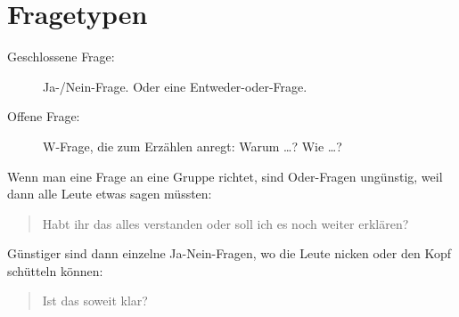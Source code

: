 \section{Fragetypen}
\label{fragetypen}

\begin{description}
\item[Geschlossene Frage:] Ja-/Nein-Frage. Oder eine Entweder-oder-Frage.
\item[Offene Frage:] W-Frage, die zum Erzählen anregt: Warum \ldots? Wie \ldots?
\end{description}

Wenn man eine Frage an eine Gruppe richtet, sind Oder-Fragen ungünstig, weil dann alle Leute etwas sagen müssten:

\begin{quotation}
Habt ihr das alles verstanden oder soll ich es noch weiter erklären?
\end{quotation}

Günstiger sind dann einzelne Ja-Nein-Fragen, wo die Leute nicken oder den Kopf schütteln können:

\begin{quotation}
Ist das soweit klar?
\end{quotation}
